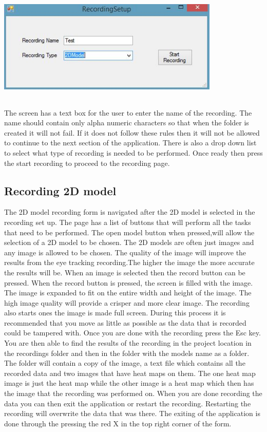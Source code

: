 \includegraphics[width=400px,height=200px]{./Images/Recordingsetup.JPG}

The screen has a text box for the user to enter the name of the recording. The name should contain only alpha numeric characters so that when the folder is created it will not fail. If it does not follow these rules then it will not be allowed to continue to the next section of the application. There is also a drop down list to select what type of recording is needed to be performed. Once ready then press the start recording to proceed to the recording page.
\subsection{Recording 2D model}
The 2D model recording form is navigated after the 2D model is selected in the recording set up. The page has a list of buttons that will perform all the tasks that need to be performed. The open model button when pressed,will allow the selection of a 2D model to be chosen. The 2D models are often just images and any image is allowed to be chosen. The quality of the image will improve the results from the eye tracking recording.The higher the image the more accurate the results will be. When an image is selected then the record button can be pressed. When the record button is pressed, the screen is filled with the image. The image is expanded to fit on the entire width and height of the image. The high image quality will provide a crisper and more clear image. The recording also starts ones the image is made full screen. During this process it is recommended that you move as little as possible as the data that is recorded could be tampered with. Once you are done with the recording press the Esc key. You are then able to find the results of the recording in the project location in the recordings folder and then in the folder with the models name as a folder. The folder will contain a copy of the image, a text file which contains all the recorded data and two images that have heat maps on them. The one heat map image is just the heat map while the other image is a heat map which then has the image that the recording was performed on. When you are done recording the data you can then exit the application or restart the recording. Restarting the recording will overwrite the data that was there. The exiting of the application is done through the pressing the red X in the top right corner of the form.

